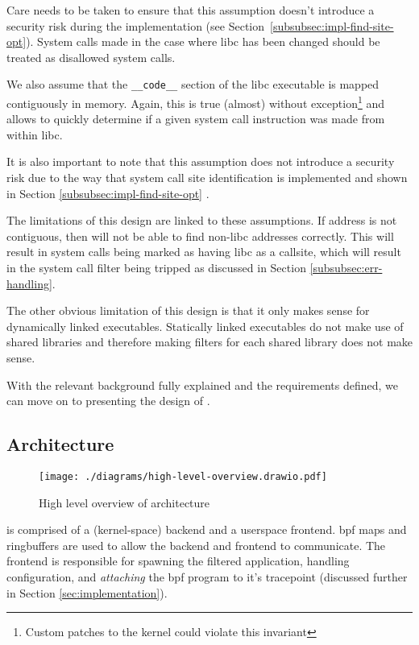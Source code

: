 Care needs to be taken to ensure that this assumption doesn't introduce a
security risk during the implementation (see Section~\ref{subsubsec:impl-find-site-opt}). 
System calls made in the case where \ac{libc} has been changed should be
treated as disallowed system calls.

We also assume that the \texttt{\_\_code\_\_} section of the \ac{libc}
executable is mapped contiguously in memory. Again, this is
true (almost) without exception\footnote{Custom patches to the kernel could
violate this invariant} and allows \af to quickly determine if a given system
call instruction was made from within \ac{libc}.

It is also important to note that this assumption does not introduce a security
risk due to the way that system call site identification is implemented and shown in
Section \ref{subsubsec:impl-find-site-opt} \cite{glibc-dl-map-segments-h}.

The limitations of this design are linked to these assumptions. If 
address is not contiguous, then \af will not be able to find non-\ac{libc}
addresses correctly. This will result in system calls being marked as having 
\ac{libc} as a callsite, which will result in the system call filter being
tripped as discussed in Section \ref{subsubsec:err-handling}. 

The other obvious limitation of this design is that it only makes sense for
dynamically linked executables. Statically linked executables do not make use of
shared libraries and therefore making filters for each shared library does not
make sense.

With the relevant background fully explained and the requirements defined, we
can move on to presenting the design of \afss.~ 

\subsection{Architecture} \label{subsec:arch}

\begin{figure}[ht]
    \centering
    \texttt{[image: ./diagrams/high-level-overview.drawio.pdf]} 
    \caption{High level overview of \afg architecture}
    \label{fig:arch-overview}
\end{figure}

\af is comprised of a (kernel-space) backend and a userspace frontend.
\ac{bpf} maps and ringbuffers are used to allow the backend and frontend to
communicate. The frontend is responsible for spawning the filtered application,
handling configuration, and \textit{attaching} the \ac{bpf} program to it's
tracepoint (discussed further in Section \ref{sec:implementation}).

